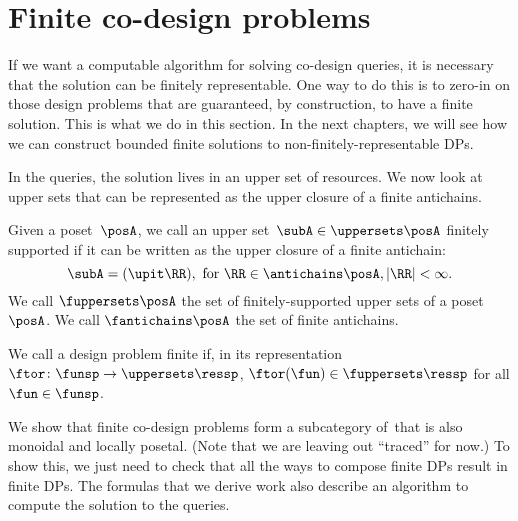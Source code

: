 \section{Finite co-design problems}

If we want a computable algorithm for solving co-design queries, it is necessary that the solution can be finitely representable.
One way to do this is to zero-in on those design problems that are guaranteed, by construction, to have a finite solution.
This is what we do in this section.
In the next chapters, we will see how we can construct bounded finite solutions to non-finitely-representable DPs.

In the \FixFunMinRes queries, the solution lives in an upper set of resources.
We now look at upper sets that can be represented as the upper closure of a finite antichains.

\begin{definition}
    \label{def:fuppersets}
    Given a poset~$\posA$, we call an upper set~$\subA \in \uppersets \posA$ finitely supported
    if it can be written as the upper closure of a finite antichain:
    \begin{equation}
        \subA = (\upit\RR), \text{ for } \RR \in \antichains \posA, |\RR| < \infty.
    \end{equation}
    We call $\fuppersets \posA$ the set of finitely-supported upper sets of a poset~$\posA$.
    We call $\fantichains \posA$ the set of finite antichains.
\end{definition}

\begin{definition}
    We call a design problem finite if, in its representation $\ftor \colon \funsp \to \uppersets \ressp$,
    $\ftor(\fun) \in \fuppersets\ressp$ for all $\fun\in\funsp$.
\end{definition}

We show that finite co-design problems form a subcategory of~\DP that is also monoidal and locally posetal.
(Note that we are leaving out ``traced'' for now.) To show this, we just need to check that all the ways to compose finite DPs result in finite DPs.
The formulas that we derive work also describe an algorithm to compute the solution to the queries.

